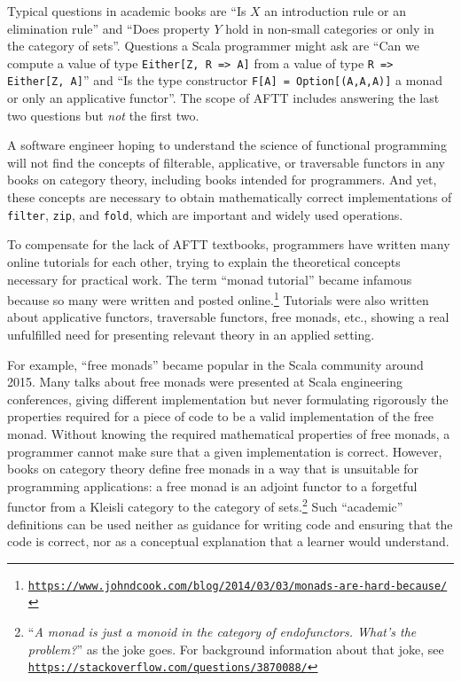 Typical questions in academic books are \textsf{``}Is $X$ an introduction
rule or an elimination rule\textsf{''} and \textsf{``}Does property $Y$ hold in non-small
categories or only in the category of sets\textsf{''}. Questions a Scala programmer
might ask are \textsf{``}Can we compute a value of type \lstinline!Either[Z, R => A]!
from a value of type \lstinline!R => Either[Z, A]!\textsf{''} and \textsf{``}Is the
type constructor \lstinline!F[A] = Option[(A,A,A)]! a monad or only
an applicative functor\textsf{''}. The scope of AFTT includes answering the
last two questions but \emph{not} the first two.

A software engineer hoping to understand the science of functional
programming will not find the concepts of filterable, applicative,
or traversable functors in any books on category theory, including
books intended for programmers. And yet, these concepts are necessary
to obtain mathematically correct implementations of \lstinline!filter!,
\lstinline!zip!, and \lstinline!fold!, which are important and widely
used operations.

To compensate for the lack of AFTT textbooks, programmers have written
many online tutorials for each other, trying to explain the theoretical
concepts necessary for practical work. The term \textsf{``}monad tutorial\textsf{''}
became infamous because so many were written and posted online.\footnote{\texttt{\href{https://www.johndcook.com/blog/2014/03/03/monads-are-hard-because/}{https://www.johndcook.com/blog/2014/03/03/monads-are-hard-because/}}}
Tutorials were also written about applicative functors, traversable
functors, free monads, etc., showing a real unfulfilled need for presenting
relevant theory in an applied setting. 

For example, \textsf{``}free monads\textsf{''} became popular in the Scala community
around 2015. Many talks about free monads were presented at Scala
engineering conferences, giving different implementation but never
formulating rigorously the properties required for a piece of code
to be a valid implementation of the free monad. Without knowing the
required mathematical properties of free monads, a programmer cannot
make sure that a given implementation is correct. However, books on
category theory define free monads in a way that is unsuitable for
programming applications: a free monad is an adjoint functor to a
forgetful functor from a Kleisli category to the category of sets.\footnote{\textsf{``}\emph{A monad is just a monoid in the category of endofunctors.
What\textsf{'}s the problem?}\textsf{''} as the joke goes. For background information
about that joke, see \texttt{\href{https://stackoverflow.com/questions/3870088/}{https://stackoverflow.com/questions/3870088/}}} Such \textsf{``}academic\textsf{''} definitions can be used neither as guidance for
writing code and ensuring that the code is correct, nor as a conceptual
explanation that a learner would understand.

